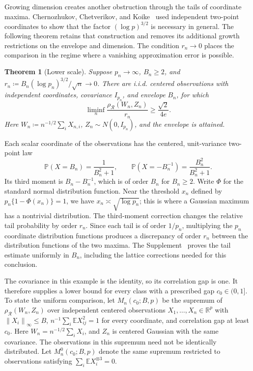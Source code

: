 \documentclass[11pt,letterpaper]{article}
\newtheorem{theorem}{Theorem}
\theoremstyle{remark}
\newcommand{\E}{\mathbb E}
\newcommand{\Pp}{\mathbb P}
\newcommand{\R}{\mathbb R}
\newcommand{\norm}[1]{\left\lVert#1\right\rVert}
\newcommand{\rh}{\rho_{\mathcal R}}
\begin{document}
Growing dimension creates another obstruction through the tails of
coordinate maxima. Chernozhukov, Chetverikov, and
Koike~\cite[Proposition~2.1]{CCK} used independent two-point coordinates
to show that the factor \((\log p)^{3/2}\) is necessary in general.
The following theorem retains that construction and removes its
additional growth restrictions on the envelope and dimension. The
condition \(r_n\to0\) places the comparison in the regime where a
vanishing approximation error is possible.
\begin{samepage}
\begin{theorem}[Lower scale]\label{opt:skew-lower}
Suppose \(p_n\to\infty\), \(B_n\ge2\), and
\(r_n\coloneqq B_n(\log p_n)^{3/2}/\sqrt n\to0\). There are i.i.d.
centered observations with independent coordinates, covariance
\(I_{p_n}\), and envelope \(B_n\), for which
\begin{equation}
 \liminf_n\frac{\rh(W_n,Z_n)}{r_n}\ge\frac{\sqrt2}{4e}.
 \label{opt:lower-constant}
\end{equation}
Here \(W_n\coloneqq n^{-1/2}\sum_iX_{n,i}\),
\(Z_n\sim N(0,I_{p_n})\), and the envelope is attained.
\end{theorem}
\end{samepage}
Each scalar coordinate of the observations has the centered,
unit-variance two-point law
\[
 \Pp(X=B_n)=\frac1{B_n^2+1},\qquad
 \Pp(X=-B_n^{-1})=\frac{B_n^2}{B_n^2+1}.
\]
Its third moment is \(B_n-B_n^{-1}\), which is of order \(B_n\)
for \(B_n\ge2\). Write \(\Phi\) for the standard normal distribution
function. Near the threshold \(x_n\) defined by
\(p_n\{1-\Phi(x_n)\}=1\), we have
\(x_n\asymp\sqrt{\log p_n}\); this is where a Gaussian maximum
has a nontrivial distribution. The third-moment correction changes
the relative tail probability by order \(r_n\). Since each tail is
of order \(1/p_n\), multiplying the \(p_n\) coordinate distribution
functions produces a discrepancy of order \(r_n\) between
the distribution functions of the two maxima. The Supplement~\cite[Section~S.4.1, Theorem~S.3 and
Lemma~S.2]{Supplement} proves the tail estimate uniformly in \(B_n\),
including the lattice corrections needed for this conclusion.

The covariance in this example is the identity, so its correlation
gap is one. It therefore supplies a lower bound for every class with
a prescribed gap \(c_0\in(0,1]\). To state the uniform comparison,
let \(M_n(c_0;B,p)\) be the supremum of \(\rh(W_n,Z_n)\) over
independent centered observations \(X_1,\ldots,X_n\in\R^p\) with
\(\norm{X_i}_\infty\le B\),
\(n^{-1}\sum_i\E X_{ij}^2=1\) for every coordinate, and correlation
gap at least \(c_0\). Here \(W_n=n^{-1/2}\sum_iX_i\), and \(Z_n\)
is centered Gaussian with the same covariance. The observations in
this supremum need not be identically distributed. Let
\(M_n^0(c_0;B,p)\) denote the same supremum restricted to observations
satisfying \(\sum_i\E X_i^{\otimes3}=0\).
\end{document}
